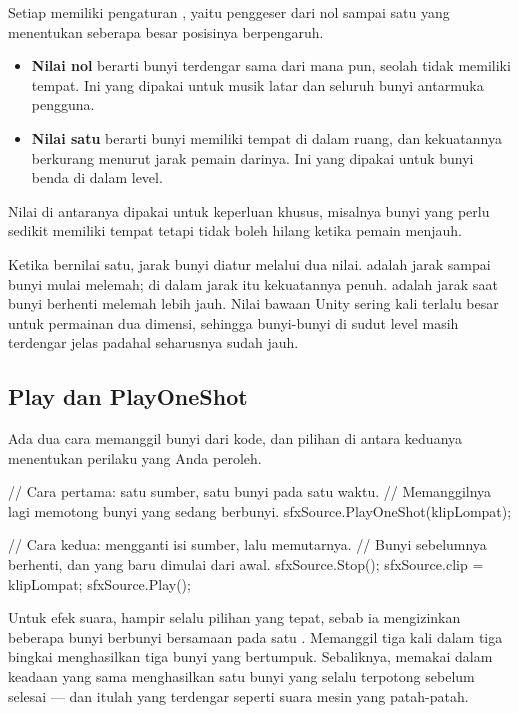 Setiap  memiliki pengaturan , yaitu
penggeser dari nol sampai satu yang menentukan seberapa besar posisinya
berpengaruh.

\begin{itemize}
  \item \textbf{Nilai nol} berarti bunyi terdengar sama dari mana pun, seolah
        tidak memiliki tempat. Ini yang dipakai untuk musik latar dan seluruh
        bunyi antarmuka pengguna.
  \item \textbf{Nilai satu} berarti bunyi memiliki tempat di dalam ruang, dan
        kekuatannya berkurang menurut jarak pemain darinya. Ini yang dipakai
        untuk bunyi benda di dalam level.
\end{itemize}

Nilai di antaranya dipakai untuk keperluan khusus, misalnya bunyi yang perlu
sedikit memiliki tempat tetapi tidak boleh hilang ketika pemain menjauh.

Ketika  bernilai satu, jarak bunyi diatur melalui dua
nilai.  adalah jarak sampai bunyi mulai melemah; di
dalam jarak itu kekuatannya penuh.  adalah jarak saat
bunyi berhenti melemah lebih jauh. Nilai bawaan Unity sering kali terlalu
besar untuk permainan dua dimensi, sehingga bunyi-bunyi di sudut level masih
terdengar jelas padahal seharusnya sudah jauh.

\subsection{Play dan PlayOneShot}

Ada dua cara memanggil bunyi dari kode, dan pilihan di antara keduanya
menentukan perilaku yang Anda peroleh.

\begin{kodekeluaran}
// Cara pertama: satu sumber, satu bunyi pada satu waktu.
// Memanggilnya lagi memotong bunyi yang sedang berbunyi.
sfxSource.PlayOneShot(klipLompat);

// Cara kedua: mengganti isi sumber, lalu memutarnya.
// Bunyi sebelumnya berhenti, dan yang baru dimulai dari awal.
sfxSource.Stop();
sfxSource.clip = klipLompat;
sfxSource.Play();
\end{kodekeluaran}

Untuk efek suara,  hampir selalu pilihan yang tepat, sebab
ia mengizinkan beberapa bunyi berbunyi bersamaan pada satu
. Memanggil  tiga kali dalam tiga bingkai
menghasilkan tiga bunyi yang bertumpuk. Sebaliknya, memakai  dalam
keadaan yang sama menghasilkan satu bunyi yang selalu terpotong sebelum
selesai --- dan itulah yang terdengar seperti suara mesin yang patah-patah.

